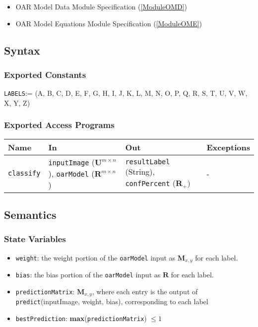 \documentclass[12pt, titlepage]{article}
\def\code#1{\texttt{#1}}
\begin{document}
\begin{itemize}
  \item OAR Model Data Module Specification (\ref{ModuleOMD})
  \item OAR Model Equations Module Specification (\ref{ModuleOME})
\end{itemize}

\subsection{Syntax}

\subsubsection{Exported Constants}

\code{LABELS}:= (A, B, C, D, E, F, G, H, I, J, K, L, M, N, O, P, Q, R, S, T, U, V, W, X, Y, Z)

\subsubsection{Exported Access Programs}

\begin{center}
\begin{tabular}{p{2cm} p{4cm} p{4cm} p{2cm}}
\hline
\textbf{Name} & \textbf{In} & \textbf{Out} & \textbf{Exceptions} \\
\hline
\code{classify} & \code{inputImage} ($\mathbf{U}^{m \times n}$), \code{oarModel} ($\mathbf{R}^{m \times n}$) & \code{resultLabel} (String), \code{confPercent} ($\mathbf{R}_{+}$) & - \\
\hline
\end{tabular}
\end{center}

\subsection{Semantics}

\subsubsection{State Variables}

\begin{itemize}
  \item \code{weight}: the weight portion of the \code{oarModel} input as $\mathbf{M}_{x,y}$ for each label.
  \item \code{bias}: the bias portion of the \code{oarModel} input as $\mathbf{R}$ for each label.
  \item \code{predictionMatrix}: $\mathbf{M}_{x,y}$, where each entry is the output of \code{predict}(inputImage, weight, bias), corresponding to each label
  \item \code{bestPrediction}: \textbf{max}(\code{predictionMatrix}) $\leq 1$
\end{itemize}
\end{document}
